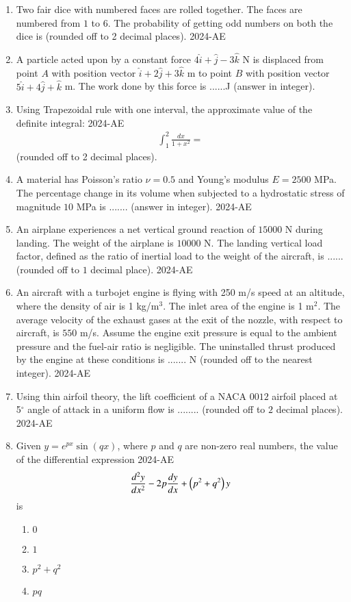 \documentclass[journal]{IEEEtran}
\begin{document}
\begin{enumerate}
    \item Two fair dice with numbered faces are rolled together. The faces are numbered from $1$ to $6$. The probability of getting odd numbers on both the dice is (rounded off to 2 decimal places).
 \hfill{2024-AE}
    \item A particle acted upon by a constant force $4\hat{i} + \hat{j} - 3\hat{k}$ N is displaced from point $A$ with position vector $\hat{i} + 2\hat{j} + 3\hat{k}$ m to point $B$ with position vector $5\hat{i} + 4\hat{j} + \hat{k}$ m. The work done by this force is ......J (answer in integer).

    \item Using Trapezoidal rule with one interval, the approximate value of the definite integral:
     \hfill{2024-AE}
\begin{align*}
\int_{1}^{2} \frac{dx}{1 + x^2} = 
\end{align*}
(rounded off to 2 decimal places).

\item A material has Poisson's ratio $\nu = 0.5$ and Young's modulus $E =2500$ MPa. The percentage change in its volume when subjected to a hydrostatic stress of magnitude $10$ MPa is ....... (answer in integer).
 \hfill{2024-AE}
\item An airplane experiences a net vertical ground reaction of $15000$ N during landing. The weight of the airplane is $10000$ N. The landing vertical load factor, defined as the ratio of inertial load to the weight of the aircraft, is ......  (rounded off to $1$ decimal place).
 \hfill{2024-AE}
\item An aircraft with a turbojet engine is flying with 250 m/s speed at an altitude, where the density of air is 1 kg/m$^3$. The inlet area of the engine is 1 m$^2$. The average velocity of the exhaust gases at the exit of the nozzle, with respect to aircraft, is $550$ m/s. Assume the engine exit pressure is equal to the ambient pressure and the fuel-air ratio is negligible. The uninstalled thrust produced by the engine at these conditions is ....... N (rounded off to the nearest integer).
 \hfill{2024-AE}
\item Using thin airfoil theory, the lift coefficient of a NACA $0012$ airfoil placed at 5$^\circ$ angle of attack in a uniform flow is ........ (rounded off to $2$ decimal places).
 \hfill{2024-AE}
\item Given $y = e^{px} \sin(qx)$, where $p$ and $q$ are non-zero real numbers, the value of the differential expression
 \hfill{2024-AE}
    \begin{align*}
    \frac{d^2 y}{dx^2} - 2p \frac{dy}{dx} + \left(p^2 + q^2\right) y
    \end{align*}
    is
    \begin{enumerate}
        \item $0$
        \item $1$
        \item $p^2 + q^2$
        \item $pq$
    \end{enumerate}


\end{enumerate}
\end{document}

